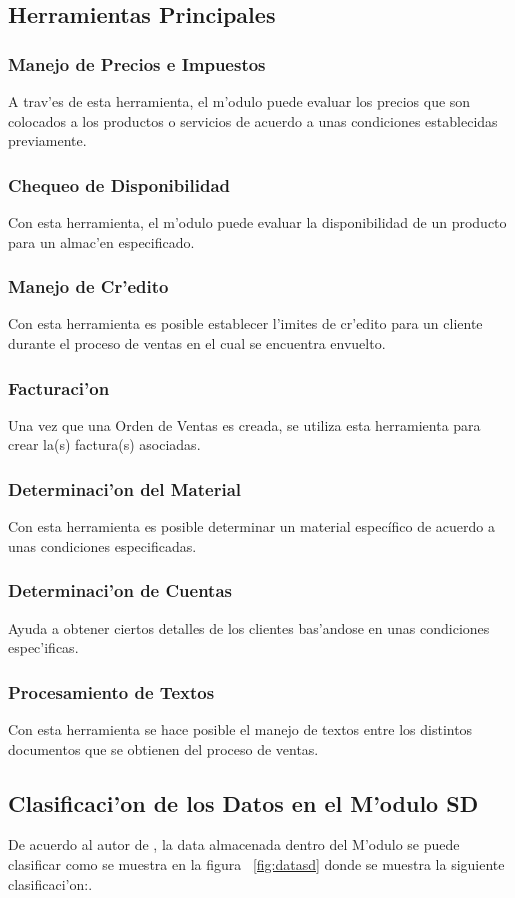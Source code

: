 \subsection{Herramientas Principales}
\subsubsection{Manejo de Precios e Impuestos}
A trav'es de esta herramienta, el m'odulo puede evaluar los precios que son colocados a los productos o servicios de acuerdo a unas condiciones establecidas previamente. 
\subsubsection{Chequeo de Disponibilidad}
Con esta herramienta, el m'odulo puede evaluar la disponibilidad de un producto para un almac'en especificado.
\subsubsection{Manejo de Cr'edito}
Con esta herramienta es posible establecer l'imites de cr'edito para un cliente durante el proceso de ventas en el cual se encuentra envuelto.
\subsubsection{Facturaci'on}
Una vez que una Orden de Ventas es creada, se utiliza esta herramienta para crear la(s) factura(s) asociadas.
\subsubsection{Determinaci'on del Material}
Con esta herramienta es posible determinar un material específico de acuerdo a unas condiciones especificadas.
\subsubsection{Determinaci'on de Cuentas}
Ayuda a obtener ciertos detalles de los clientes bas'andose en unas condiciones espec'ificas.
\subsubsection{Procesamiento de Textos}
Con esta herramienta se hace posible el manejo de textos entre los distintos documentos que se obtienen del proceso de ventas.


\subsection{Clasificaci'on de los Datos en el M'odulo SD}
De acuerdo al autor de \cite{SD01}, la data almacenada dentro del M'odulo se puede clasificar como se muestra en la figura ~\ref{fig:datasd} donde se muestra la siguiente clasificaci'on:.
